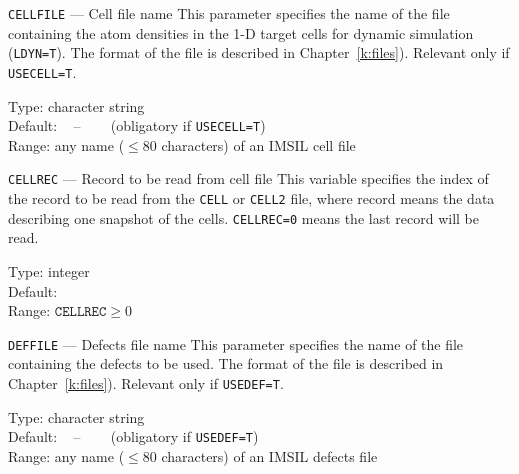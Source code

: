 \begin{keydescription}{\texttt{CELLFILE} --- Cell file name}
%
  This parameter specifies the name of the file containing the atom
  densities in the 1-D target cells for dynamic simulation
  (\texttt{LDYN=T}). The format of the file is described in
  Chapter~\ref{k:files}). Relevant only if \texttt{USECELL=T}.
  
  \begin{keytab}
    Type:    \> character string \\
    Default: \> ~ -- ~~~ (obligatory if \texttt{USECELL=T}) \\
    Range:   \> any name ($\le 80$ characters) of an IMSIL cell file
  \end{keytab}
\end{keydescription}

\begin{keydescription}{\texttt{CELLREC} --- Record to be read from
cell file}
%
  This variable specifies the index of the record to be read from the
  \texttt{CELL} or \texttt{CELL2} file, where record means the
  data describing one snapshot of the cells. \texttt{CELLREC=0} means the last
  record will be read.

  \begin{keytab}
    Type:    \> integer \\
    Default:  \\
    Range:   \> $\texttt{CELLREC} \ge 0$
  \end{keytab}
\end{keydescription}

\ifprivate
\begin{keydescription}{\texttt{DEFFILE} --- Defects file name}
%
  This parameter specifies the name of the file containing the defects to be
  used. The format of the file is described in Chapter~\ref{k:files}). Relevant
  only if \texttt{USEDEF=T}.
  
  \begin{keytab}
    Type:    \> character string \\
    Default: \> ~ -- ~~~ (obligatory if \texttt{USEDEF=T}) \\
    Range:   \> any name ($\le 80$ characters) of an IMSIL defects file
  \end{keytab}
\end{keydescription}
\fi

